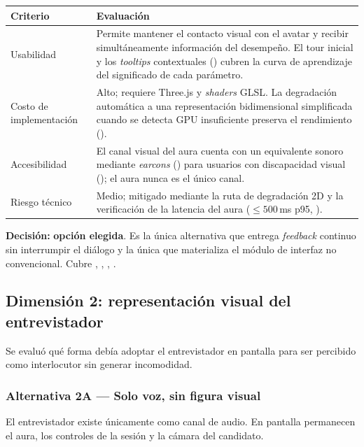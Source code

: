 \begin{table}[ht]
\centering\footnotesize
\renewcommand{\arraystretch}{1.2}
\begin{tabularx}{\linewidth}{@{}p{3.6cm} Y@{}}
\toprule
\textbf{Criterio} & \textbf{Evaluación} \\
\midrule
Usabilidad & Permite mantener el contacto visual con el avatar y
recibir simultáneamente información del desempeño. El tour inicial y
los \textit{tooltips} contextuales () cubren la curva de
aprendizaje del significado de cada parámetro. \\
Costo de implementación & Alto; requiere Three.js y \textit{shaders}
GLSL. La degradación automática a una representación bidimensional
simplificada cuando se detecta GPU insuficiente preserva el
rendimiento (). \\
Accesibilidad & El canal visual del aura cuenta con un equivalente
sonoro mediante \textit{earcons} () para usuarios con
discapacidad visual (); el aura nunca es el único canal. \\
Riesgo técnico & Medio; mitigado mediante la ruta de degradación 2D y
la verificación de la latencia del aura ($\le 500$\,ms p95,
). \\
\bottomrule
\end{tabularx}
\end{table}

\noindent\textbf{Decisión:} \textbf{opción elegida}. Es la única
alternativa que entrega \textit{feedback} continuo sin interrumpir el
diálogo y la única que materializa el módulo de interfaz no
convencional. Cubre , , , .

\subsection{Dimensión 2: representación visual del entrevistador}

Se evaluó qué forma debía adoptar el entrevistador en pantalla para
ser percibido como interlocutor sin generar incomodidad.

\subsubsection*{Alternativa 2A — Solo voz, sin figura visual}
El entrevistador existe únicamente como canal de audio. En pantalla
permanecen el aura, los controles de la sesión y la cámara del
candidato.

